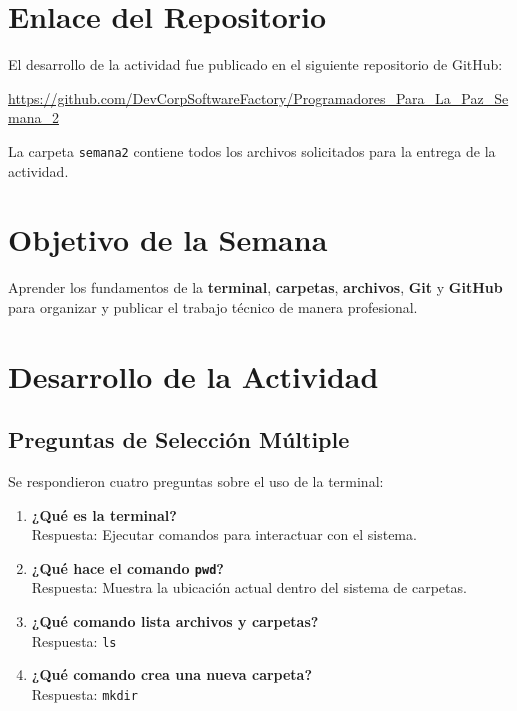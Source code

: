 \documentclass[12pt,a4paper]{article}
\begin{document}
\section{Enlace del Repositorio}

El desarrollo de la actividad fue publicado en el siguiente repositorio de GitHub:

\vspace{0.5cm}

\begin{center}
\large
\url{https://github.com/DevCorpSoftwareFactory/Programadores_Para_La_Paz_Semana_2}
\end{center}

\vspace{0.5cm}

\noindent La carpeta \texttt{semana2} contiene todos los archivos solicitados para la entrega de la actividad.

\section{Objetivo de la Semana}

Aprender los fundamentos de la \textbf{terminal}, \textbf{carpetas}, \textbf{archivos}, \textbf{Git} y \textbf{GitHub} para organizar y publicar el trabajo técnico de manera profesional.

\section{Desarrollo de la Actividad}

\subsection{Preguntas de Selección Múltiple}

Se respondieron cuatro preguntas sobre el uso de la terminal:

\begin{enumerate}[label=\textbf{\arabic*.}]
    \item \textbf{¿Qué es la terminal?} \\
    Respuesta: Ejecutar comandos para interactuar con el sistema.
    
    \item \textbf{¿Qué hace el comando \texttt{pwd}?} \\
    Respuesta: Muestra la ubicación actual dentro del sistema de carpetas.
    
    \item \textbf{¿Qué comando lista archivos y carpetas?} \\
    Respuesta: \texttt{ls}
    
    \item \textbf{¿Qué comando crea una nueva carpeta?} \\
    Respuesta: \texttt{mkdir}
\end{enumerate}
\end{document}
